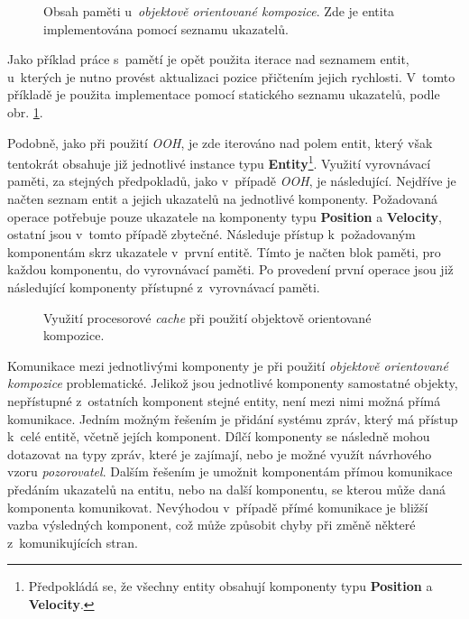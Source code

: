 \begin{figure}[H]
	\centering
	\caption{Obsah paměti u~\emph{objektově orientované kompozice}. Zde je entita implementována pomocí seznamu ukazatelů.}
	\label{Fig:OOCImpl}
\end{figure}

Jako příklad práce s~pamětí je opět použita iterace nad seznamem entit, u~kterých je nutno provést aktualizaci pozice přičtením jejich rychlosti. V~tomto příkladě je použita implementace pomocí statického seznamu ukazatelů, podle obr. \ref{Fig:OOCImpl}.

Podobně, jako při použití \emph{OOH}, je zde iterováno nad polem entit, který však tentokrát obsahuje již jednotlivé instance typu \textbf{Entity}\footnote{Předpokládá se, že všechny entity obsahují komponenty typu \textbf{Position} a \textbf{Velocity}.}. Využití vyrovnávací paměti, za stejných předpokladů, jako v~případě \emph{OOH}, je následující. Nejdříve je načten seznam entit a jejich ukazatelů na jednotlivé komponenty. Požadovaná operace potřebuje pouze ukazatele na komponenty typu \textbf{Position} a \textbf{Velocity}, ostatní jsou v~tomto případě zbytečné. Následuje přístup k~požadovaným komponentám skrz ukazatele v~první entitě. Tímto je načten blok paměti, pro každou komponentu, do vyrovnávací paměti. Po provedení první operace jsou již následující komponenty přístupné z~vyrovnávací paměti. 

\begin{figure}[H]
	\centering
	\caption{Využití procesorové \emph{cache} při použití objektově orientované kompozice.}
	\label{Fig:OOCCache}
\end{figure}

Komunikace mezi jednotlivými komponenty je při použití \emph{objektově orientované kompozice} problematické. Jelikož jsou jednotlivé komponenty samostatné objekty, nepřístupné z~ostatních komponent stejné entity, není mezi nimi možná přímá komunikace. Jedním možným řešením je přidání systému zpráv, který má přístup k~celé entitě, včetně jejích komponent. Dílčí komponenty se následně mohou dotazovat na typy zpráv, které je zajímají, nebo je možné využít návrhového vzoru \emph{pozorovatel}. Dalším řešením je umožnit komponentám přímou komunikace předáním ukazatelů na entitu, nebo na další komponentu, se kterou může daná komponenta komunikovat. Nevýhodou v~případě přímé komunikace je bližší vazba výsledných komponent, což může způsobit chyby při změně některé z~komunikujících stran.

